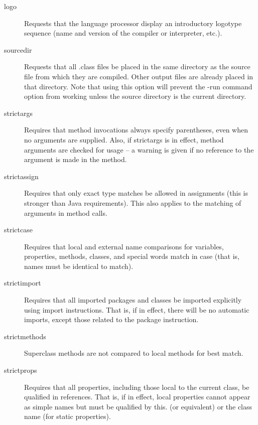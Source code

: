 \begin{description}
\item[logo]
Requests that the language processor display an introductory logotype sequence (name and version of the compiler or interpreter, etc.).
\item[sourcedir]
Requests that all .class files be placed in the same directory as the source file from which they are compiled. Other output files are already placed in that directory. Note that using this option will prevent the -run command option from working unless the source directory is the current directory.
\item[strictargs]
Requires that method invocations always specify parentheses, even when no arguments are supplied. Also, if strictargs is in effect, method arguments are checked for usage – a warning is given if no reference to the argument is made in the method.
\item[strictassign]
Requires that only exact type matches be allowed in assignments (this is stronger than Java requirements). This also applies to the matching of arguments in method calls.
\item[strictcase]
Requires that local and external name comparisons for variables, properties, methods, classes, and special words match in case (that is, names must be identical to match).
\item[strictimport]
Requires that all imported packages and classes be imported explicitly using import instructions. That is, if in effect, there will be no automatic imports, except those related to the package instruction.
\item[strictmethods]
Superclass methods are not compared to local methods for best match.
\item[strictprops]
Requires that all properties, including those local to the current class, be qualified in references. That is, if in effect, local properties cannot appear as simple names but must be qualified by this. (or equivalent) or the class name (for static properties).

\end{description}
